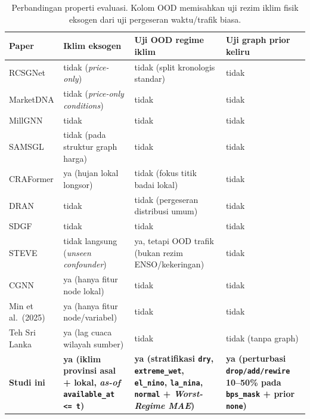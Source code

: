 \documentclass[11pt,a4paper]{article}
\begin{document}
\begin{table}[H]
\centering
\footnotesize
\setlength{\tabcolsep}{4pt}
\begin{tabular}{@{}L{2.6cm}L{3.2cm}L{3.8cm}L{4.4cm}@{}}
\toprule
Paper & Iklim eksogen & Uji OOD regime iklim & Uji graph prior keliru \\
\midrule
RCSGNet \cite{bai2026rcsgnet} & tidak (\emph{price-only}) & tidak (split kronologis standar) & tidak \\
MarketDNA \cite{marketdna2026} & tidak (\emph{price-only conditions}) & tidak & tidak \\
MillGNN \cite{millgnn2025} & tidak & tidak & tidak \\
SAMSGL \cite{samsgl2023} & tidak (pada struktur graph harga) & tidak & tidak \\
CRAFormer \cite{craformer2025} & ya (hujan lokal longsor) & tidak (fokus titik badai lokal) & tidak \\
DRAN \cite{dran2025} & tidak & tidak (pergeseran distribusi umum) & tidak \\
SDGF \cite{sdgf2025} & tidak & tidak & tidak \\
STEVE \cite{ji2025steve} & tidak langsung (\emph{unseen confounder}) & ya, tetapi OOD trafik (bukan rezim ENSO/kekeringan) & tidak \\
CGNN \cite{cgnn2023} & ya (hanya fitur node lokal) & tidak & tidak \\
Min et al.\ (2025) & ya (hanya fitur node/variabel) & tidak & tidak \\
Teh Sri Lanka \cite{tea2026} & ya (lag cuaca wilayah sumber) & tidak & tidak (tanpa graph) \\
\midrule
\textbf{Studi ini} & \textbf{ya (iklim provinsi asal + lokal, \emph{as-of} \texttt{available\_at <= t})} & \textbf{ya (stratifikasi \texttt{dry}, \texttt{extreme\_wet}, \texttt{el\_nino}, \texttt{la\_nina}, \texttt{normal} + \emph{Worst-Regime MAE})} & \textbf{ya (perturbasi \texttt{drop/add/rewire} 10--50\% pada \texttt{bps\_mask} + prior \texttt{none})} \\
\bottomrule
\end{tabular}
\caption{Perbandingan properti evaluasi. Kolom OOD memisahkan uji rezim iklim fisik eksogen dari uji pergeseran waktu/trafik biasa.}
\end{table}
\end{document}
